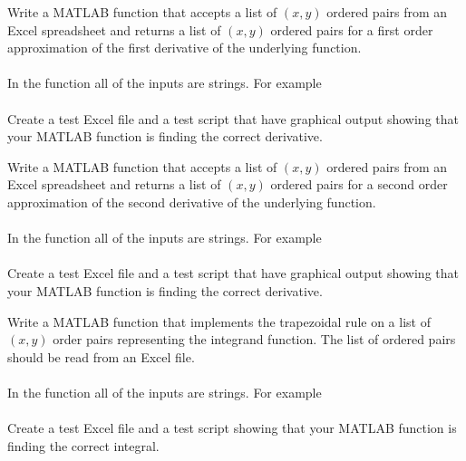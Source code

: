 \begin{problem}\label{prob:first_deriv_data}
    Write a MATLAB function that accepts a list of $(x,y)$ ordered pairs from an Excel
    spreadsheet and returns a list of $(x,y)$ ordered pairs for a first order
    approximation of the first derivative of the
    underlying function. \\
     \\
    In the function all of the inputs are strings.  For example \\
    \\
    Create a test Excel file and a test script that have graphical output showing that
    your MATLAB function is finding the correct derivative.
\end{problem}



\begin{problem}
    Write a MATLAB function that accepts a list of $(x,y)$ ordered pairs from an Excel
    spreadsheet and returns a list of $(x,y)$ ordered pairs for a second order
    approximation of the second derivative of the
    underlying function. \\
     \\
    In the function all of the inputs are strings.  For example \\
    \\
    Create a test Excel file and a test script that have graphical output showing that
    your MATLAB function is finding the correct derivative.
\end{problem}


\begin{problem}\label{prob:trap_from_data}
    Write a MATLAB function that implements the trapezoidal rule on a list of $(x,y)$
    order pairs representing the integrand function.  The list of ordered pairs should be
    read from an Excel file. \\
    \\
    In the function all of the inputs are strings.  For example \\
    \\
    Create a test Excel file and a test script showing that your MATLAB function is
    finding the correct integral.
\end{problem}

